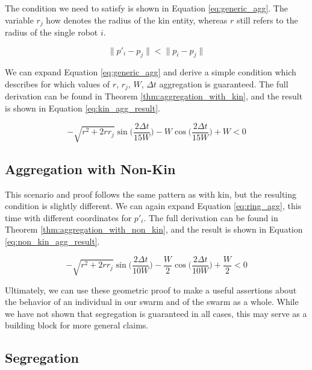 \documentclass[conference]{IEEEtran}
\begin{document}
    The condition we need to satisfy is shown in Equation \eqref{eq:generic_agg}. The variable $r_j$ how denotes the radius of the kin entity, whereas $r$ still refers to the radius of the single robot $i$.

    \begin{equation} \label{eq:generic_agg}
      \lVert p'_i - p_j \rVert < \lVert p_i - p_j \rVert
    \end{equation}

    We can expand Equation \eqref{eq:generic_agg} and derive a simple condition which describes for which values of $r$, $r_j$, $W$, $\Delta t$ aggregation is guaranteed. The full derivation can be found in Theorem \ref{thm:aggregation_with_kin}, and the result is shown in Equation \eqref{eq:kin_agg_result}.

    \begin{equation} \label{eq:kin_agg_result}
      -\sqrt{r^2+2rr_j}\sin\bigg(\frac{2\Delta t}{15W}\bigg) - W\cos\bigg(\frac{2\Delta t}{15W}\bigg) + W < 0
    \end{equation}

  \subsection{Aggregation with Non-Kin}

    This scenario and proof follows the same pattern as with kin, but the resulting condition is slightly different. We can again expand Equation \eqref{eq:ring_agg}, this time with different coordinates for $p'_i$. The full derivation can be found in Theorem \ref{thm:aggregation_with_non_kin}, and the result is shown in Equation \eqref{eq:non_kin_agg_result}.

    \begin{equation} \label{eq:non_kin_agg_result}
      -\sqrt{r^2+2rr_j}\sin\bigg(\frac{2\Delta t}{10W}\bigg) - \frac{W}{2}\cos\bigg(\frac{2\Delta t}{10W}\bigg) + \frac{W}{2} < 0
    \end{equation}

    Ultimately, we can use these geometric proof to make a useful assertions about the behavior of an individual in our swarm and of the swarm as a whole. While we have not shown that segregation is guaranteed in all cases, this may serve as a building block for more general claims.

  \subsection{Segregation}
\end{document}

